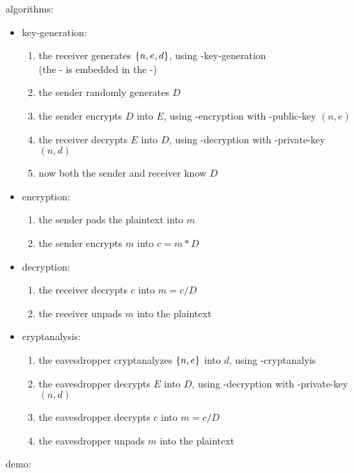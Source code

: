 algorithms:
\begin{itemize}
\item key-generation:
  \begin{enumerate}
  \item the receiver generates $\left\{ n, e, d \right\}$,
    using \rsa-key-generation \\
    (the \rsa-\cs{} is embedded in the \dummy-\cs)
  \item the sender randomly generates $D$
  \item the sender encrypts $D$ into $E$,
    using \rsa-encryption with \rsa-public-key $(n, e)$
  \item the receiver decrypts $E$ into $D$,
    using \rsa-decryption with \rsa-private-key $(n, d)$
  \item now both the sender and receiver know $D$
  \end{enumerate}
\item encryption:
  \begin{enumerate}
  \item the sender pads the plaintext into $m$
  \item the sender encrypts $m$ into $c = m * D$
  \end{enumerate}
\item decryption:
  \begin{enumerate}
  \item the receiver decrypts $c$ into $m = c / D$
  \item the receiver unpads $m$ into the plaintext
  \end{enumerate}
\item cryptanalysis:
  \begin{enumerate}
  \item the eavesdropper cryptanalyzes $\left\{ n, e \right\}$
    into $d$, using \rsa-cryptanalyis
  \item the eavesdropper decrypts $E$ into $D$,
    using \rsa-decryption with \rsa-private-key $(n, d)$
  \item the eavesdropper decrypts $c$ into $m = c / D$
  \item the eavesdropper unpads $m$ into the plaintext
  \end{enumerate}
\end{itemize}

demo:
\codes{}


\subsubsection{\cry{} \cf}

\codes{}

